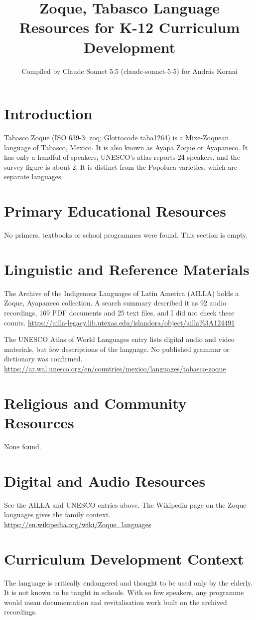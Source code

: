\documentclass[12pt]{article}
\title{Zoque, Tabasco Language Resources for K-12 Curriculum Development}
\author{Compiled by Claude Sonnet 5.5 (claude-sonnet-5-5) for Andr\'as Kornai}
\date{}
\begin{document}
\maketitle

\section{Introduction}
Tabasco Zoque (ISO 639-3: zoq; Glottocode taba1264) is a Mixe-Zoquean language of Tabasco, Mexico. It is also known as Ayapa Zoque or Ayapaneco. It has only a handful of speakers; UNESCO's atlas reports 24 speakers, and the survey figure is about 2. It is distinct from the Popoluca varieties, which are separate languages.

\section{Primary Educational Resources}
No primers, textbooks or school programmes were found. This section is empty.

\section{Linguistic and Reference Materials}
The Archive of the Indigenous Languages of Latin America (AILLA) holds a Zoque, Ayapaneco collection. A search summary described it as 92 audio recordings, 169 PDF documents and 25 text files, and I did not check these counts. \url{https://ailla-legacy.lib.utexas.edu/islandora/object/ailla%3A124491}

The UNESCO Atlas of World Languages entry lists digital audio and video materials, but few descriptions of the language. No published grammar or dictionary was confirmed. \url{https://ar.wal.unesco.org/en/countries/mexico/languages/tabasco-zoque}

\section{Religious and Community Resources}
None found.

\section{Digital and Audio Resources}
See the AILLA and UNESCO entries above. The Wikipedia page on the Zoque languages gives the family context. \url{https://en.wikipedia.org/wiki/Zoque_languages}

\section{Curriculum Development Context}
The language is critically endangered and thought to be used only by the elderly. It is not known to be taught in schools. With so few speakers, any programme would mean documentation and revitalisation work built on the archived recordings.
\end{document}

